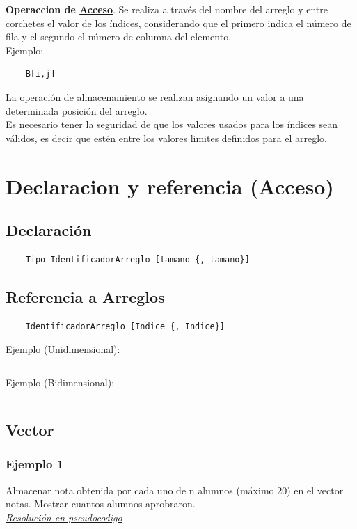 \documentclass{article}
\begin{document}
\textbf{Operaccion de \underline{Acceso}}. Se realiza a través del nombre del
arreglo y entre corchetes el valor de los índices, considerando que el primero
indica el número de fila y el segundo el número de columna del elemento.\\

Ejemplo:
\begin{verbatim}
    B[i,j]
\end{verbatim}

La operación de almacenamiento se realizan asignando un valor a una determinada posición del arreglo.\\

Es necesario tener la seguridad de que los valores usados para los índices sean
válidos, es decir que estén entre los valores limites definidos para el
arreglo.\\

\section*{Declaracion y referencia (Acceso)}%
\subsection*{Declaración}%
\begin{verbatim}
    Tipo IdentificadorArreglo [tamano {, tamano}]
\end{verbatim}

\subsection*{Referencia a Arreglos}%
\begin{verbatim}
    IdentificadorArreglo [Indice {, Indice}]
\end{verbatim}

Ejemplo (Unidimensional):
\inputminted{./pseudocode.py:PseudocodeLexer -x}{./pseudocodigo/uso_unidimensional.algo}
\newpage

Ejemplo (Bidimensional):
\inputminted{./pseudocode.py:PseudocodeLexer -x}{./pseudocodigo/uso_bidimensional.algo}

\subsection*{Vector}%
\subsubsection*{Ejemplo 1}%
Almacenar nota obtenida por cada uno de n alumnos (máximo 20) en el vector
notas. Mostrar cuantos alumnos aprobraron.\\
\underline{\textit{Resolución en pseudocodigo}}\\
\inputminted{./pseudocode.py:PseudocodeLexer -x}{./pseudocodigo/001_ejemplo.algo}
\end{document}

